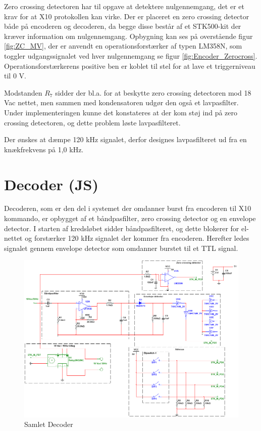 Zero crossing detectoren har til opgave at detektere nulgennemgang, det er et krav for at X10 protokollen kan virke. Der er placeret en zero crossing detector både på encoderen og decoderen, da begge disse består af et STK500-kit der kræver information om nulgennemgang. Opbygning kan ses på overstående figur \ref{fig:ZC_MV}, der er anvendt en operationsforstærker af typen LM358N, som toggler udgangssignalet ved hver nulgennemgang se figur \ref{fig:Encoder_Zerocross}. Operationsforstærkerens positive ben er koblet til stel for at lave et triggerniveau til 0 V.

Modstanden $R_7$ sidder der bl.a. for at beskytte zero crossing detectoren mod 18 Vac nettet, men sammen med kondensatoren udgør den også et lavpasfilter. Under implementeringen kunne det konstateres at der kom støj ind på zero crossing detectoren, og dette problem løste lavpasfilteret. 

Der ønskes at dæmpe 120 kHz signalet, derfor designes lavpasfilteret ud fra en knækfrekvens på 1,0 kHz.

\section{Decoder (JS)}
Decoderen, som er den del i systemet der omdanner burst fra encoderen til X10 kommando, er opbygget af et båndpasfilter, zero crossing detector og en envelope detector. I starten af kredsløbet sidder båndpasfilteret, og dette blokerer for el-nettet og forstærker 120 kHz signalet der kommer fra encoderen. Herefter ledes signalet gennem envelope detector som omdanner burstet til et TTL signal.

\begin{figure}[htbp]
	\centering
	\includegraphics[width=\textwidth]{billeder/HWdesign/Decoder}
	\caption{Samlet Decoder}
	\label{fig:Decoder}
\end{figure}


